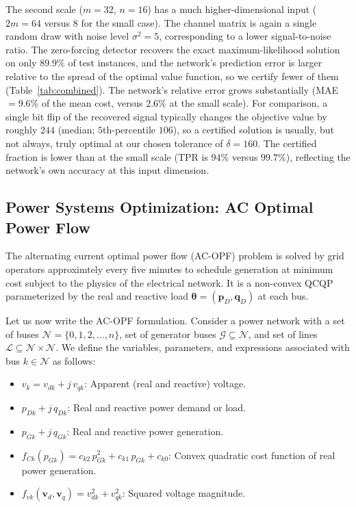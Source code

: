 \documentclass[10pt]{article} %
\theoremstyle{plain}
\theoremstyle{definition}
\theoremstyle{remark}
\begin{document}
The second scale ($m=32$, $n=16$) has a much higher-dimensional input ($2m=64$ versus $8$ for the small case). The channel matrix is again a single random draw with noise level $\sigma^2=5$, corresponding to a lower signal-to-noise ratio. The zero-forcing detector recovers the exact maximum-likelihood solution on only $89.9\%$ of test instances, and the network's prediction error is larger relative to the spread of the optimal value function, so we certify fewer of them (Table~\ref{tab:combined}).
The network's relative error grows substantially (MAE $= 9.6\%$ of the mean cost, versus $2.6\%$ at the small scale). For comparison, a single bit flip of the recovered signal typically changes the objective value by roughly $244$ (median; $5$th-percentile $106$), so a certified solution is usually, but not always, truly optimal at our chosen tolerance of $\delta = 160$. The certified fraction is lower than at the small scale (TPR is $94\%$ versus $99.7\%$), reflecting the network's own accuracy at this input dimension.

\subsection{Power Systems Optimization: AC Optimal Power Flow}
\label{subsec:acopf-experiment}

The alternating current optimal power flow (AC-OPF) problem is solved by grid operators approximtely every five minutes to schedule generation at minimum cost subject to the physics of the electrical network.
It is a non-convex QCQP parameterized by the real and reactive load $\bm{\theta} = (\mathbf{p}_D, \mathbf{q}_D)$ at each bus.

Let us now write the AC-OPF formulation. Consider a power network with a set of buses $\mathcal{N} = \{0, 1, 2, ..., n\}$, set of generator buses $\mathcal{G} \subseteq \mathcal{N}$, and set of lines $\mathcal{L} \subseteq \mathcal{N} \times \mathcal{N}$. We define the variables, parameters, and expressions associated with bus $k \in \mathcal{N}$ as follows:
\begin{itemize}[itemsep=2pt, topsep=0pt, parsep=0pt, partopsep=0pt]
    \item $v_k = v_{dk} + j\, v_{qk}$: Apparent (real and reactive) voltage.
    \item $p_{Dk} + j\, q_{Dk}$: Real and reactive power demand or load.
    \item $p_{Gk} + j\, q_{Gk}$: Real and reactive power generation.
    \item $f_{Ck}(p_{Gk}) = c_{k2}\, p_{Gk}^2 + c_{k1} \, p_{Gk} + c_{k0}$: Convex quadratic cost function of real power generation.
    \item $f_{vk}(\mathbf{v}_d, \mathbf{v}_q) = v_{dk}^2 + v_{qk}^2$: Squared voltage magnitude.
\end{itemize}
\end{document}
